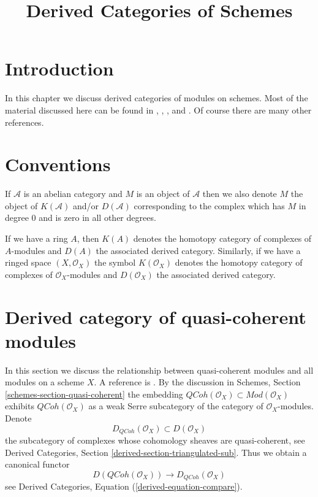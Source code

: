 \documentclass{stacks-project}
\theoremstyle{plain}
\theoremstyle{definition}
\theoremstyle{remark}
\numberwithin{equation}{subsection}
\def\QCoh{\mathit{QCoh}}
\begin{document}
\title{Derived Categories of Schemes}


\maketitle

\label{section-phantom}

\tableofcontents

\section{Introduction}
\label{section-introduction}

\noindent
In this chapter we discuss derived categories of modules on schemes.
Most of the material discussed here can be found in
\cite{TT}, \cite{Bokstedt-Neeman}, \cite{BvdB}, and \cite{LN}.
Of course there are many other references.


\section{Conventions}
\label{section-conventions}

\noindent
If $\mathcal{A}$ is an abelian category and $M$ is an object
of $\mathcal{A}$ then we also denote $M$ the object of $K(\mathcal{A})$
and/or $D(\mathcal{A})$ corresponding to the complex which has
$M$ in degree $0$ and is zero in all other degrees.

\medskip\noindent
If we have a ring $A$, then $K(A)$ denotes the homotopy category
of complexes of $A$-modules and $D(A)$ the associated derived category.
Similarly, if we have a ringed space $(X, \mathcal{O}_X)$ the symbol
$K(\mathcal{O}_X)$ denotes the homotopy category of complexes of
$\mathcal{O}_X$-modules and $D(\mathcal{O}_X)$ the associated derived
category.










\section{Derived category of quasi-coherent modules}
\label{section-derived-quasi-coherent}

\noindent
In this section we discuss the relationship between quasi-coherent
modules and all modules on a scheme $X$. A reference is
\cite[Appendix B]{TT}. By the discussion in
Schemes, Section \ref{schemes-section-quasi-coherent}
the embedding
$\QCoh(\mathcal{O}_X) \subset \textit{Mod}(\mathcal{O}_X)$
exhibits $\QCoh(\mathcal{O}_X)$ as a weak Serre subcategory of
the category of $\mathcal{O}_X$-modules. Denote
$$
D_\QCoh(\mathcal{O}_X) \subset D(\mathcal{O}_X)
$$
the subcategory of complexes whose cohomology sheaves are quasi-coherent, see
Derived Categories, Section \ref{derived-section-triangulated-sub}.
Thus we obtain a canonical functor
\begin{equation}
\label{equation-compare}
D(\QCoh(\mathcal{O}_X))
\longrightarrow
D_\QCoh(\mathcal{O}_X)
\end{equation}
see Derived Categories, Equation (\ref{derived-equation-compare}).
\end{document}
